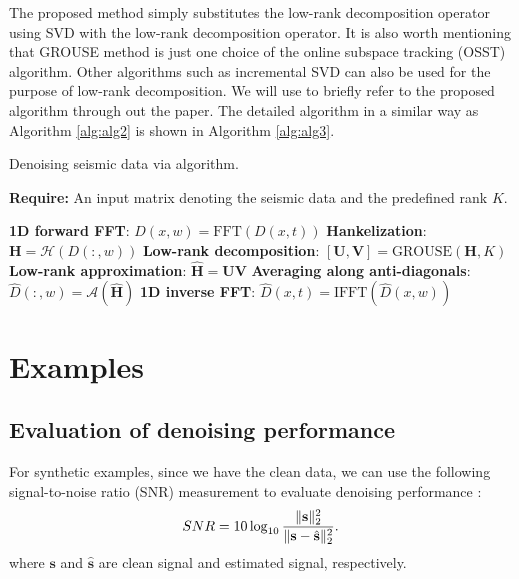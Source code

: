 The proposed method simply substitutes the low-rank decomposition operator using SVD with the  low-rank decomposition operator. It is also worth mentioning that GROUSE method is just one choice of the online subspace tracking (OSST) algorithm. Other  algorithms such as incremental SVD \cite[]{Sarwar02inc} can also be used for the purpose of low-rank decomposition. We will use  to briefly refer to the proposed algorithm through out the paper. The detailed  algorithm in a similar way as Algorithm \ref{alg:alg2} is shown in Algorithm \ref{alg:alg3}. 

\begin{algorithm}
   \caption{Denoising seismic data via  algorithm. }
   \textbf{Require:} An input matrix denoting the seismic data and the predefined rank $K$.
    \begin{algorithmic}[1]
    \State \textbf{1D forward FFT}: $D(x,w)=\text{FFT}\left(D(x,t)\right)$
     \State \textbf{Hankelization}: $\mathbf{H}=\mathcal{H}(D(:,w))$
     \State \textbf{Low-rank decomposition}: $[\mathbf{U},\mathbf{V}]=\text{GROUSE}(\mathbf{H},K)$
     \State \textbf{Low-rank approximation}: $\hat{\mathbf{H}}=\mathbf{U}\mathbf{V}$
     \State \textbf{Averaging along anti-diagonals}: $\hat{D}(:,w)=\mathcal{A}(\hat{\mathbf{H}})$
        \EndFor 
         \State \textbf{1D inverse FFT}: $\hat{D}(x,t)=\text{IFFT}\left(\hat{D}(x,w)\right)$
\end{algorithmic}
\label{alg:alg3}
\end{algorithm}


\section{Examples}

\subsection{Evaluation of denoising performance}
For synthetic examples, since we have the clean data, we can use the following signal-to-noise ratio (SNR) measurement to evaluate denoising performance \cite[]{guochang2009}:
\begin{equation}
\label{eq:snr}
SNR=10\log_{10}\frac{\Arrowvert \mathbf{s} \Arrowvert_2^2}{\Arrowvert \mathbf{s} -\hat{\mathbf{s}}\Arrowvert_2^2}.
\end{equation}
where $\mathbf{s}$ and $\hat{\mathbf{s}}$ are clean signal and estimated signal, respectively.

